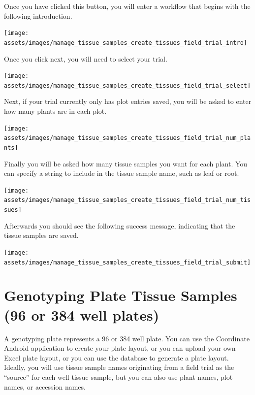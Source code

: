\documentclass[
  12pt,
]{book}
\begin{document}
Once you have clicked this button, you will enter a workflow that begins with the following introduction.

\begin{center}\texttt{[image: assets/images/manage\_tissue\_samples\_create\_tissues\_field\_trial\_intro]} \end{center}

Once you click next, you will need to select your trial.

\begin{center}\texttt{[image: assets/images/manage\_tissue\_samples\_create\_tissues\_field\_trial\_select]} \end{center}

Next, if your trial currently only has plot entries saved, you will be asked to enter how many plants are in each plot.

\begin{center}\texttt{[image: assets/images/manage\_tissue\_samples\_create\_tissues\_field\_trial\_num\_plants]} \end{center}

Finally you will be asked how many tissue samples you want for each plant. You can specify a string to include in the tissue sample name, such as leaf or root.

\begin{center}\texttt{[image: assets/images/manage\_tissue\_samples\_create\_tissues\_field\_trial\_num\_tissues]} \end{center}

Afterwards you should see the following success message, indicating that the tissue samples are saved.

\begin{center}\texttt{[image: assets/images/manage\_tissue\_samples\_create\_tissues\_field\_trial\_submit]} \end{center}

\hypertarget{genotyping-plate-tissue-samples-96-or-384-well-plates}{%
\section{Genotyping Plate Tissue Samples (96 or 384 well plates)}\label{genotyping-plate-tissue-samples-96-or-384-well-plates}}

A genotyping plate represents a 96 or 384 well plate. You can use the Coordinate Android application to create your plate layout, or you can upload your own Excel plate layout, or you can use the database to generate a plate layout. Ideally, you will use tissue sample names originating from a field trial as the ``source'' for each well tissue sample, but you can also use plant names, plot names, or accession names.
\end{document}
